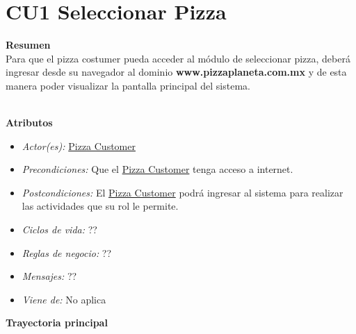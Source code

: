 
\pagebreak
\hypertarget{CU1}{}
\section{CU1 Seleccionar Pizza}

	\noindent \textbf{Resumen}\\

		Para que el pizza costumer pueda acceder al módulo de seleccionar pizza, deberá ingresar desde su navegador al dominio {\textbf{www.pizzaplaneta.com.mx}} y de esta manera poder visualizar la pantalla principal del sistema.

	\noindent \textbf{\\Atributos}

		\begin{itemize}

			\item \textit{Actor(es):} \hyperlink{A:Pizza Customer}{Pizza Customer}
			\item \textit{Precondiciones:} Que el \hyperlink{A:Pizza Customer}{Pizza Customer} tenga acceso a internet. 
			\item \textit{Postcondiciones:} El \hyperlink{A:Pizza Customer}{Pizza Customer} podrá ingresar al sistema para realizar las actividades que su rol le permite.
			\item \textit{Ciclos de vida:} ??
			\item \textit{Reglas de negocio:} ??
			\item \textit{Mensajes:} ??
			\item \textit{Viene de:} No aplica

		\end{itemize} 

	\noindent \textbf{Trayectoria principal}

